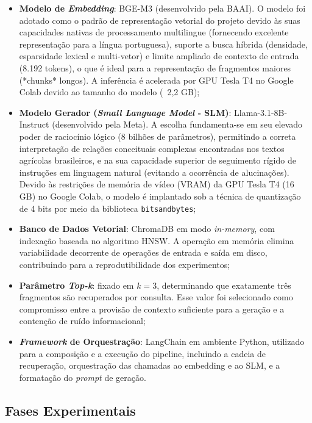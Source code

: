 \documentclass[
	12pt,				%
	openright,			%
	oneside,			%
	a4paper,			%
	tccpreliminar,		%
	]{ABNT-DC-UEL}
\begin{document}
\begin{itemize}
    \item \textbf{Modelo de \textit{Embedding}}: BGE-M3 (desenvolvido pela BAAI). O modelo foi adotado como o padrão de representação vetorial do projeto devido às suas capacidades nativas de processamento multilingue (fornecendo excelente representação para a língua portuguesa), suporte a busca híbrida (densidade, esparsidade lexical e multi-vetor) e limite ampliado de contexto de entrada (8.192 tokens), o que é ideal para a representação de fragmentos maiores (*chunks* longos). A inferência é acelerada por GPU Tesla T4 no Google Colab devido ao tamanho do modelo (~2,2 GB);
    
    \item \textbf{Modelo Gerador (\textit{Small Language Model} - SLM)}: Llama-3.1-8B-Instruct (desenvolvido pela Meta). A escolha fundamenta-se em seu elevado poder de raciocínio lógico (8 bilhões de parâmetros), permitindo a correta interpretação de relações conceituais complexas encontradas nos textos agrícolas brasileiros, e na sua capacidade superior de seguimento rígido de instruções em linguagem natural (evitando a ocorrência de alucinações). Devido às restrições de memória de vídeo (VRAM) da GPU Tesla T4 (16 GB) no Google Colab, o modelo é implantado sob a técnica de quantização de 4 bits por meio da biblioteca \texttt{bitsandbytes};
    
    \item \textbf{Banco de Dados Vetorial}: ChromaDB em modo \textit{in-memory}, com indexação baseada no algoritmo HNSW. A operação em memória elimina variabilidade decorrente de operações de entrada e saída em disco, contribuindo para a reprodutibilidade dos experimentos;
    
    \item \textbf{Parâmetro \textit{Top-k}}: fixado em $k = 3$, determinando que exatamente três fragmentos são recuperados por consulta. Esse valor foi selecionado como compromisso entre a provisão de contexto suficiente para a geração e a contenção de ruído informacional;
    
    \item \textbf{\textit{Framework} de Orquestração}: LangChain em ambiente Python, utilizado para a composição e a execução do pipeline, incluindo a cadeia de recuperação, orquestração das chamadas ao embedding e ao SLM, e a formatação do \textit{prompt} de geração.
\end{itemize}

\subsection{Fases Experimentais}
\end{document}
